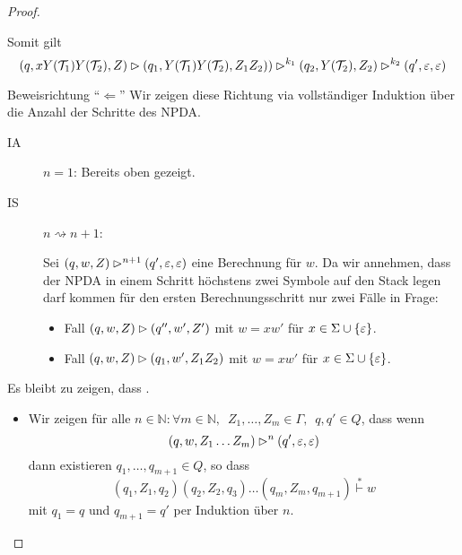 \begin{proof}
\begin{itemize}
\begin{description}
\begin{itemize}
                    Somit gilt
          \begin{displaymath}
            (q, xY(\mathcal{T}_1)Y(\mathcal{T}_2), Z) \rhd (q_1, Y(\mathcal{T}_1)Y(\mathcal{T}_2), Z_1Z_2)) \rhd^{k_1} (q_2, Y(\mathcal{T}_2), Z_2) \rhd^{k_2} (q', \varepsilon, \varepsilon)
          \end{displaymath}
      \end{itemize}
      
     \end{description}

    \end{itemize}
    
    \item Beweisrichtung ``$\Leftarrow$''
     Wir zeigen diese Richtung via vollständiger Induktion über die Anzahl der Schritte des \ac{NPDA}.
     \begin{description}
      \item[IA] $n=1$: Bereits oben gezeigt.
      \item[IS] $n\rightsquigarrow n+1$:
      
      Sei $(q,w,Z) \rhd^{n+1} (q',\varepsilon,\varepsilon)$ eine Berechnung für $w$. Da wir annehmen, 
      dass der \ac{NPDA} in einem Schritt höchstens zwei Symbole auf den Stack legen darf kommen für den ersten Berechnungsschritt nur zwei Fälle in Frage:
      \begin{itemize}
      \item Fall $(q,w,Z)\rhd (q'', w',Z')$ mit $w=xw'$ für $x\in\Sigma\cup\{\varepsilon\}$.
      \item Fall $(q,w,Z)\rhd (q_1, w',Z_1Z_2)$ mit $w=xw'$ für $x\in\Sigma\cup\{\varepsilon\}$.
      \end{itemize}
     \end{description}
     

    \color{red}
    

    Es bleibt zu zeigen, dass .
    \begin{itemize}

    \item Wir zeigen für alle $n \in \mathbb{N}: \forall m \in \mathbb{N},\enspace Z_1,\ldots,Z_m \in \Gamma,\enspace q,q' \in Q$, dass wenn
      \begin{displaymath}
        (q,w,Z_1\ldots Z_m) \rhd^n (q', \varepsilon, \varepsilon)
      \end{displaymath}
      dann existieren $q_1,\ldots,q_{m+1} \in Q$, so dass
      \begin{displaymath}
        (q_1,Z_1,q_2)(q_2,Z_2,q_3)\ldots(q_m,Z_m,q_{m+1}) \stackrel{*}{\vdash} w
      \end{displaymath}
      mit $q_1 = q$ und $q_{m+1} = q'$ per Induktion über $n$.


\end{itemize}
\end{proof}
